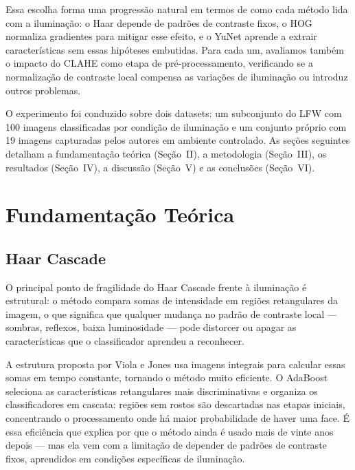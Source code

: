 \documentclass[conference]{IEEEtran}
\begin{document}
Essa escolha forma uma progress\~ao natural em termos de como cada m\'etodo lida com a ilumina\c{c}\~ao: o Haar depende de padr\~oes de contraste fixos, o HOG normaliza gradientes para mitigar esse efeito, e o YuNet aprende a extrair caracter\'isticas sem essas hip\'oteses embutidas. Para cada um, avaliamos tamb\'em o impacto do CLAHE \cite{Zuiderveld1994} como etapa de pr\'e-processamento, verificando se a normaliza\c{c}\~ao de contraste local compensa as varia\c{c}\~oes de ilumina\c{c}\~ao ou introduz outros problemas.

O experimento foi conduzido sobre dois datasets: um subconjunto do LFW \cite{LFWTech} com 100 imagens classificadas por condi\c{c}\~ao de ilumina\c{c}\~ao e um conjunto pr\'oprio com 19 imagens capturadas pelos autores em ambiente controlado. As se\c{c}\~oes seguintes detalham a fundamenta\c{c}\~ao te\'orica (Se\c{c}\~ao~II), a metodologia (Se\c{c}\~ao~III), os resultados (Se\c{c}\~ao~IV), a discuss\~ao (Se\c{c}\~ao~V) e as conclus\~oes (Se\c{c}\~ao~VI).

\section{Fundamenta\c{c}\~ao Te\'orica}

\subsection{Haar Cascade}
O principal ponto de fragilidade do Haar Cascade frente \`a ilumina\c{c}\~ao \'e estrutural: o m\'etodo compara somas de intensidade em regi\~oes retangulares da imagem, o que significa que qualquer mudan\c{c}a no padr\~ao de contraste local --- sombras, reflexos, baixa luminosidade --- pode distorcer ou apagar as caracter\'isticas que o classificador aprendeu a reconhecer.

A estrutura proposta por Viola e Jones \cite{ViolaJones2001} usa imagens integrais para calcular essas somas em tempo constante, tornando o m\'etodo muito eficiente. O AdaBoost seleciona as caracter\'isticas retangulares mais discriminativas e organiza os classificadores em cascata: regi\~oes sem rostos s\~ao descartadas nas etapas iniciais, concentrando o processamento onde h\'a maior probabilidade de haver uma face. \'E essa efici\^encia que explica por que o m\'etodo ainda \'e usado mais de vinte anos depois --- mas ela vem com a limita\c{c}\~ao de depender de padr\~oes de contraste fixos, aprendidos em condi\c{c}\~oes espec\'ificas de ilumina\c{c}\~ao.
\end{document}
